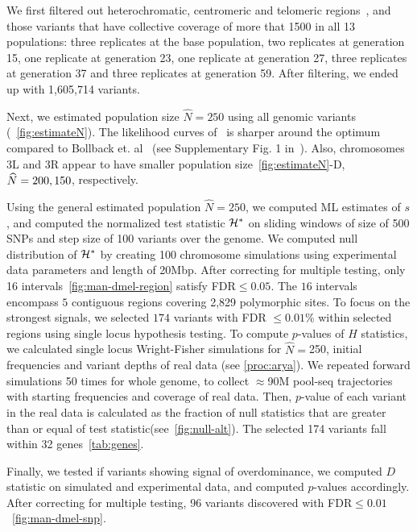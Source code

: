 We first filtered out heterochromatic, centromeric and telomeric
regions~\cite{fiston2010drosophila}, and those variants that have
collective coverage of more that 1500 in all 13 populations: three
replicates at the base population, two replicates at generation 15,
one replicate at generation 23, one replicate at generation 27, three
replicates at generation 37 and three replicates at generation
59. After filtering, we ended up with 1,605,714 variants.

Next, we estimated population size $\hat{N}=250$ using all genomic
variants (~\ref{fig:estimateN}). The likelihood curves of \comale\ is
sharper around the optimum compared to Bollback
et. al~\cite{bollback2008estimation} (see Supplementary Fig. 1
in~\cite{orozco2012adaptation}).  Also, chromosomes 3L and 3R appear
to have smaller population size~\ref{fig:estimateN}-D, $\widehat{N}=200,150$,
respectively. 

Using the general estimated population $\hat{N}=250$, we computed ML
estimates of $s$, and computed the normalized test statistic ${\cal H}^*$
on sliding windows of size of 500 SNPs and step size of 100 variants
over the genome.  We computed null distribution of ${\cal H}^*$ by creating
100 chromosome simulations using experimental data parameters and
length of 20Mbp. After correcting for multiple testing, only 16
intervals~\ref{fig:man-dmel-region} satisfy FDR$\le0.05$. The $16$
intervals encompass $5$ contiguous regions covering 2,829 polymorphic
sites. To focus on the strongest signals, we selected $174$ variants
with FDR $\le0.01$\% within selected regions using single locus
hypothesis testing.  To compute $p$-values of $H$ statistics, we
calculated single locus Wright-Fisher simulations for
$\widehat{N}=$250, initial frequencies and variant depths of real data
(see \ref{proc:arya}). We repeated forward simulations 50 times for
whole genome, to collect $\approx$90M pool-seq trajectories with
starting frequencies and coverage of real data. Then, $p$-value of
each variant in the real data is calculated as the fraction of null
statistics that are greater than or equal of test
statistic(see~\ref{fig:null-alt}).
The selected 174 variants fall within 32 genes~\ref{tab:genes}.

Finally, we tested 
if variants showing signal of overdominance, we computed $D$ 
statistic on simulated and experimental data, and computed $p$-values 
accordingly. 
After correcting for multiple testing, 96 variants discovered with 
FDR$\le 0.01$~\ref{fig:man-dmel-snp}. 

